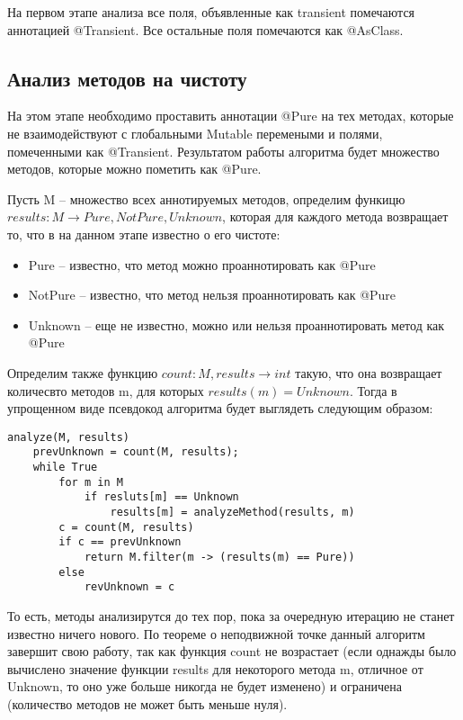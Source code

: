 На первом этапе анализа все поля, объявленные как transient помечаются аннотацией @Transient. Все остальные поля помечаются как @AsClass. 

\subsection{Анализ методов на чистоту}

На этом этапе необходимо проставить аннотации @Pure на тех методах, которые не взаимодействуют с глобальными Mutable перемеными и полями, помеченными как @Transient. Результатом работы алгоритма будет множество методов, которые можно пометить как @Pure. 

Пусть M -- множество всех аннотируемых методов, определим функицю $results: M \rightarrow {Pure, NotPure, Unknown}$, которая для каждого метода возвращает то, что в на данном этапе известно о его чистоте:
\begin{itemize}
\item Pure -- известно, что метод можно проаннотировать как @Pure
\item NotPure -- известно, что метод нельзя проаннотировать как @Pure
\item Unknown -- еще не известно, можно или нельзя проаннотировать метод как @Pure
\end{itemize}

Определим также функцию $count: M, results \rightarrow int$ такую, что она возвращает количесвто методов m, для которых $results(m) = Unknown$. Тогда в упрощенном виде псевдокод алгоритма будет выглядеть следующим образом:

\begin{lstlisting}[caption=Анализ чистоты методов, label=code:purity]
analyze(M, results)
    prevUnknown = count(M, results);
    while True 
        for m in M 
            if resluts[m] == Unknown
                results[m] = analyzeMethod(results, m)
        c = count(M, results)
        if c == prevUnknown 
        	return M.filter(m -> (results(m) == Pure))        
        else 
            revUnknown = c
\end{lstlisting}

То есть, методы анализирутся до тех пор, пока за очередную итерацию не станет известно ничего нового. По теореме о неподвижной точке данный алгоритм завершит свою работу, так как функция count не возрастает (если однажды было вычислено значение функции results для некоторого метода m, отличное от Unknown, то оно уже больше никогда не будет изменено) и ограничена (количество методов не может быть меньше нуля). 

